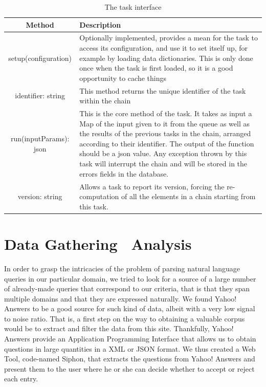 \begin{table}
  \caption{The task interface}
  \label{tab:task_interface}
  
  \begin{center}
    \begin{tabular}{c | l}
      Method & Description\\
      \hline
      setup(configuration) & Optionally implemented, provides a mean for the task to access its configuration, and use it to set itself up, for example by loading data dictionaries. This is only done once when the task is first loaded, so it is a good opportunity to cache things\\
      identifier: string & This method returns the unique identifier of the task within the chain\\
      run(inputParams): json & This is the core method of the task. It takes as input a Map of the input given to it from the queue as well as the results of the previous tasks in the chain, arranged according to their identifier. The output of the function should be a json value. Any exception thrown by this task will interrupt the chain and will be stored in the errors fields in the database.\\
      version: string & Allows a task to report its version, forcing the re-computation of all the elements in a chain starting from this task.\\
    \end{tabular}
  \end{center}
\end{table}


\section{Data Gathering \amper\ Analysis} %
\label{sec:data_gathering_and_analysis}

In order to grasp the intricacies of the problem of parsing natural language queries in our particular domain, we tried to look for a source of a large number of already-made queries that correspond to our criteria, that is that they span multiple domains and that they are expressed naturally. We found Yahoo! Answers to be a good source for such kind of data, albeit with a very low signal to noise ratio. That is, a first step on the way to obtaining a valuable corpus would be to extract and filter the data from this site. Thankfully, Yahoo! Answers provide an Application Programming Interface that allows us to obtain questions in large quantities in a XML or JSON format. We thus created a Web Tool, code-named Siphon, that extracts the questions from Yahoo! Answers and present them to the user where he or she can decide whether to accept or reject each entry.

